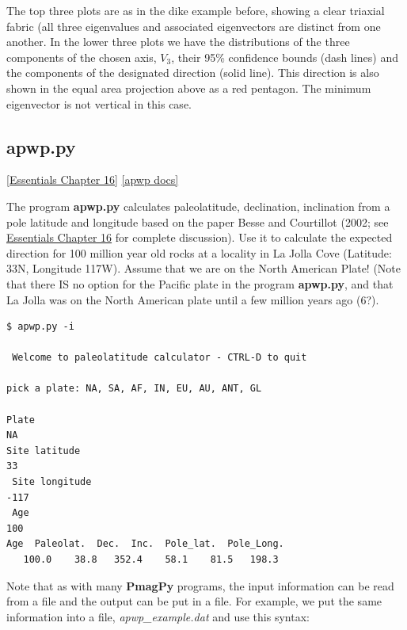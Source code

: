 \documentclass[11pt]{book}
\begin{document}
{{   The top three plots are as in the dike example before, showing a clear triaxial fabric (all three eigenvalues and associated eigenvectors are distinct from one another.  In the lower three plots we have the distributions of the three components of the chosen axis,  $V_3$, their 95\% confidence bounds (dash lines) and the components of the designated direction (solid line).  This direction is also shown in the equal area projection above as a red pentagon.  The minimum eigenvector is not vertical in this case.




\subsection{apwp.py }
\href{http://earthref.org/MAGIC/books/Tauxe/Essentials/WebBook3ch16.html#ch16}{[Essentials Chapter 16]}
\href{https://github.com/PmagPy/PmagPy/blob/master/programs/apwp.py}{[apwp docs]}

The program {\bf apwp.py} calculates paleolatitude, declination, inclination from  a pole latitude and longitude based on  the paper Besse and Courtillot (2002; see  \href{http://earthref.org/MAGIC/books/Tauxe/Essentials/WebBook3ch16.html#apparent_polar_wander_path}{Essentials Chapter 16} for complete discussion).  \nocite{besse02}
Use it  to calculate the expected direction for 100 million year old rocks at a locality in La Jolla Cove (Latitude: 33N, Longitude 117W).    Assume that we are on the North American Plate!  (Note that there IS no option for the Pacific plate in the program {\bf apwp.py}, and that La Jolla was on the North American plate until a few million years ago (6?).

\begin{verbatim}
$ apwp.py -i

 Welcome to paleolatitude calculator - CTRL-D to quit

pick a plate: NA, SA, AF, IN, EU, AU, ANT, GL

Plate
NA
Site latitude
33
 Site longitude
-117
 Age
100
Age  Paleolat.  Dec.  Inc.  Pole_lat.  Pole_Long.
   100.0    38.8   352.4    58.1    81.5   198.3

\end{verbatim}

Note that as with many {\bf PmagPy}  programs, the input information can be read from a file and the output can be put in a file.   For example, we put the same information into a file, {\it apwp\_example.dat} and use this syntax:

}}
\end{document}
